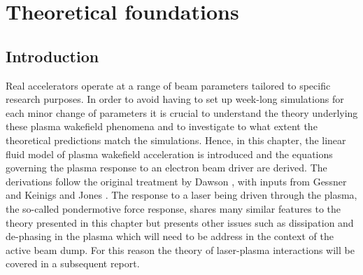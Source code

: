 \chapter{Theoretical foundations}
\label{theorychapter}
\section{Introduction}
Real accelerators operate at a range of beam parameters tailored to specific research purposes. In order to avoid having to set up week-long simulations for each minor change of parameters it is crucial to understand the theory underlying these plasma wakefield phenomena and to investigate to what extent the theoretical predictions match the simulations. Hence, in this chapter, the linear fluid model of plasma wakefield acceleration is introduced and  the equations governing the plasma response to an electron beam driver are derived. The derivations follow the original treatment by Dawson \cite{Katsouleas1987}, with inputs from Gessner \citep{Gessner2016} and Keinigs and Jones \cite{Keinigs1987}. The response to a laser being driven through the plasma, the so-called pondermotive force response, shares many similar features to the theory presented in this chapter but presents other issues such as dissipation and de-phasing in the plasma which will need to be address in the context of the active beam dump. For this reason the theory of laser-plasma interactions will be covered in a subsequent report.  %
